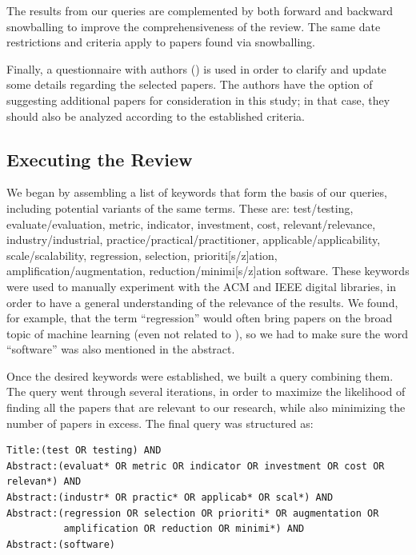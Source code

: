 The results from our queries are complemented by both forward and backward snowballing to improve the comprehensiveness of the review. 
The same date restrictions and criteria apply to papers found via snowballing.

Finally, a questionnaire with authors () is used in order to clarify and update some details regarding the selected papers.
The authors have the option of suggesting additional papers for consideration in this study; in that case, they should also be analyzed according to the established criteria.

\subsection{Executing the Review}
We began by assembling a list of keywords that form the basis of our queries, including potential variants of the same terms. 
These are: test/testing, evaluate/evaluation, metric, indicator, investment, cost, relevant/relevance, industry/industrial, practice/practical/practitioner, applicable/applicability, scale/scalability, regression, selection, prioriti[s/z]ation, amplification/augmentation, reduction/minimi[s/z]ation software.
These keywords were used to manually experiment with the ACM and IEEE digital libraries, in order to have a general understanding of the relevance of the results. 
We found, for example, that the term ``regression'' would often bring papers on the broad topic of machine learning (even not related to \rt), so we had to make sure the word ``software'' was also mentioned in the abstract.

Once the desired keywords were established, we built a query combining them.
The query went through several iterations, in order to maximize the likelihood of finding all the papers that are relevant to our research, while also minimizing the number of papers in excess.
The final query was structured as:

\begin{tcolorbox}
\small
\begin{verbatim}
Title:(test OR testing) AND 
Abstract:(evaluat* OR metric OR indicator OR investment OR cost OR relevan*) AND
Abstract:(industr* OR practic* OR applicab* OR scal*) AND
Abstract:(regression OR selection OR prioriti* OR augmentation OR 
          amplification OR reduction OR minimi*) AND
Abstract:(software)
\end{verbatim}
\end{tcolorbox}

